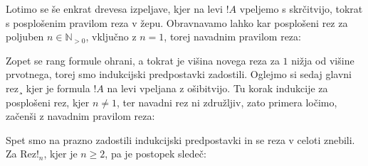 Lotimo se še enkrat drevesa izpeljave, kjer na levi $!A$ vpeljemo s skrčitvijo, tokrat s posplošenim pravilom reza v žepu. Obravnavamo lahko kar posplošeni rez za poljuben $n\in\mathbb{N}_{>0}$, vključno z $n = 1$, torej navadnim pravilom reza:
\begin{prooftree}


\end{prooftree}
\dol
\begin{prooftree}


\end{prooftree}
Zopet se rang formule ohrani, a tokrat je višina novega reza za $1$ nižja od višine prvotnega, torej smo indukcijski predpostavki zadostili. Oglejmo si sedaj glavni rez¸ kjer je formula $!A$ na levi vpeljana z ošibitvijo. Tu korak indukcije za posplošeni rez, kjer $n\neq1$, ter navadni rez ni združljiv, zato primera ločimo, začenši z navadnim pravilom reza:
\begin{prooftree}


\end{prooftree}
\dol
\begin{prooftree}
\end{prooftree}
Spet smo na prazno zadostili indukcijski predpostavki in se reza v celoti znebili. Za Rez!$_n$, kjer je $n\geq2$, pa je postopek sledeč:
